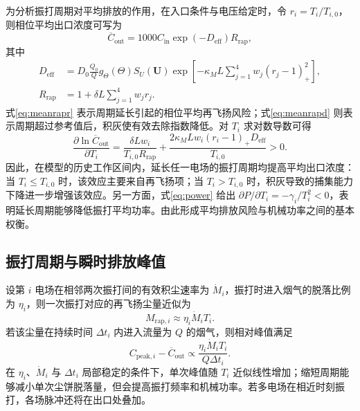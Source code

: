 为分析振打周期对平均排放的作用，在入口条件与电压给定时，令 $r_i=T_i/T_{i,0}$，则相位平均出口浓度可写为
\begin{equation}
\overline C_{\mathrm{out}}
=1000C_{\mathrm{in}}\exp(-D_{\mathrm{eff}})R_{\mathrm{rap}},
\label{eq:meanrapc}
\end{equation}
其中
\begin{align}
D_{\mathrm{eff}}
&=D_0\frac{Q_0}{Q}g_\Theta(\Theta)S_U(\bm U)
\exp\!\left[-\kappa_ML\sum_{j=1}^{4}w_j(r_j-1)_+^2\right],\label{eq:meanrapd}\\
R_{\mathrm{rap}}
&=1+\delta L\sum_{j=1}^{4}w_jr_j.\label{eq:meanrapr}
\end{align}
式\eqref{eq:meanrapr} 表示周期延长引起的相位平均再飞扬风险；式\eqref{eq:meanrapd} 则表示周期超过参考值后，积灰使有效去除指数降低。对 $T_i$ 求对数导数可得
\begin{equation}
\frac{\partial\ln\overline C_{\mathrm{out}}}{\partial T_i}
=\frac{\delta Lw_i}{T_{i,0}R_{\mathrm{rap}}}
+\frac{2\kappa_MLw_i(r_i-1)_+D_{\mathrm{eff}}}{T_{i,0}}>0.
\label{eq:rapmeanderivative}
\end{equation}
因此，在模型的历史工作区间内，延长任一电场的振打周期均提高平均出口浓度：当 $T_i\le T_{i,0}$ 时，该效应主要来自再飞扬项；当 $T_i>T_{i,0}$ 时，积灰导致的捕集能力下降进一步增强该效应。另一方面，式\eqref{eq:power} 给出 $\partial P/\partial T_i=-\gamma_i/T_i^2<0$，表明延长周期能够降低振打平均功率。由此形成平均排放风险与机械功率之间的基本权衡。

\subsection{振打周期与瞬时排放峰值}

设第 $i$ 电场在相邻两次振打间的有效积尘速率为 $\dot M_i$，振打时进入烟气的脱落比例为 $\eta_i$，则一次振打对应的再飞扬尘量近似为
\begin{equation}
M_{\mathrm{rap},i}\approx \eta_i\dot M_iT_i.
\label{eq:rapmass}
\end{equation}
若该尘量在持续时间 $\Delta t_i$ 内进入流量为 $Q$ 的烟气，则相对峰值满足
\begin{equation}
C_{\mathrm{peak},i}-\overline C_{\mathrm{out}}
\propto\frac{\eta_i\dot M_iT_i}{Q\Delta t_i}.
\label{eq:rappeak}
\end{equation}
在 $\eta_i$、$\dot M_i$ 与 $\Delta t_i$ 局部稳定的条件下，单次峰值随 $T_i$ 近似线性增加；缩短周期能够减小单次尘饼脱落量，但会提高振打频率和机械功率。若多电场在相近时刻振打，各场脉冲还将在出口处叠加。

